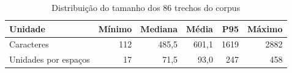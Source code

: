 \begin{table}[htbp]
\centering
\small
\caption{Distribuição do tamanho dos 86 trechos do corpus}
\label{tab:tamanhos_corpus}
\begin{tabular}{lrrrrr}
\hline
Unidade & Mínimo & Mediana & Média & P95 & Máximo \\
\hline
Caracteres & 112 & 485,5 & 601,1 & 1619 & 2882 \\
Unidades por espaços & 17 & 71,5 & 93,0 & 247 & 458 \\
\hline
\end{tabular}
\end{table}
